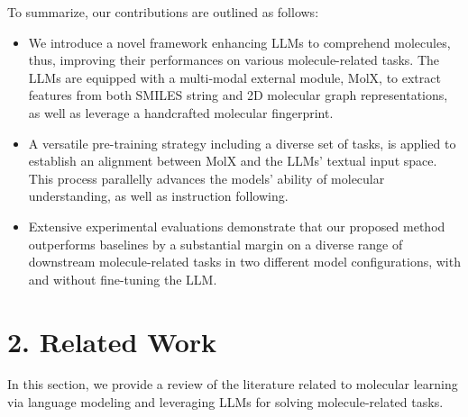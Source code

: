 To summarize, our contributions are outlined as follows: 
\begin{itemize}
    \item We introduce a novel framework enhancing LLMs to comprehend molecules, thus, improving their performances on various molecule-related tasks. The LLMs are equipped with a multi-modal external module, MolX, to extract features from both SMILES string and 2D molecular graph representations, as well as leverage a handcrafted molecular fingerprint. 
    \item A versatile pre-training strategy including a diverse set of tasks, is applied to establish an alignment between MolX and the LLMs’ textual input space. This process parallelly advances the models’ ability of molecular understanding, as well as instruction following. 
    \item Extensive experimental evaluations demonstrate that our proposed method outperforms baselines by a substantial margin on a diverse range of downstream molecule-related tasks in two different model configurations, with and without fine-tuning the LLM. 
\end{itemize}

\section{2. Related Work}
In this section, we provide a review of the literature related to molecular learning via language modeling and leveraging LLMs for solving molecule-related tasks. 

